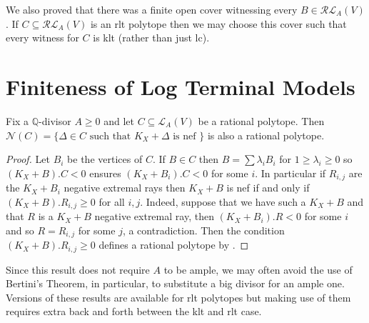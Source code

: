 \documentclass[a4paper,12pt]{amsart}
\newcommand\myworries[1]{\textcolor{red}{#1}}
\begin{document}
	We also proved that there was a finite open cover witnessing every $B \in \mathcal{RL}_{A}(V)$. If $C \subseteq \mathcal{RL}_{A}(V)$ is an rlt polytope then we may choose this cover such that every witness for $C$ is klt (rather than just lc). 

	\section{Finiteness of Log Terminal Models}
	
	
	\begin{lemma}\label{neftope}
		Fix a $\mathbb{Q}$-divisor $A \geq 0$ and let $C\subseteq \mathcal{L}_{A}(V)$ be a rational polytope. Then $\mathcal{N}(C)=\{\Delta \in C \text{ such that } K_{X}+\Delta \text{ is nef } \}$ is also a rational polytope.
	\end{lemma}

	\begin{proof}	
		Let $B_{i}$ be the vertices of $C$. If $B \in C$ then $B= \sum \lambda_{i} B_{i}$ for $1 \geq \lambda_{i} \geq 0$ so $(K_{X}+B).C <0$ ensures $(K_{X}+B_{i}).C <0$ for some $i$. In particular if $R_{i,j}$ are the $K_{X}+B_{i}$ negative extremal rays then $K_{X}+B$ is nef if and only if $(K_{X}+B).R_{i,j} \geq 0$ for all $i,j$. Indeed, suppose that we have such a $K_{X}+B$ and that $R$ is a $K_{X}+B$ negative extremal ray, then $(K_{X}+B_{i}).R <0$ for some $i$ and so $R=R_{i,j}$ for some $j$, a contradiction. Then the condition $(K_{X}+B).R_{i,j} \geq 0$ defines a rational polytope by \cite[Proposition 9.31]{bhatt2020globally+}.
	\end{proof}
	
	Since this result does not require $A$ to be ample, we may often avoid the use of Bertini's Theorem, \cite[Lemma 3.7.3]{birkar2010existence} in particular, to substitute a big divisor for an ample one. Versions of these results are available for rlt polytopes but making use of them requires extra back and forth between the klt and rlt case. 
	
\end{document}
